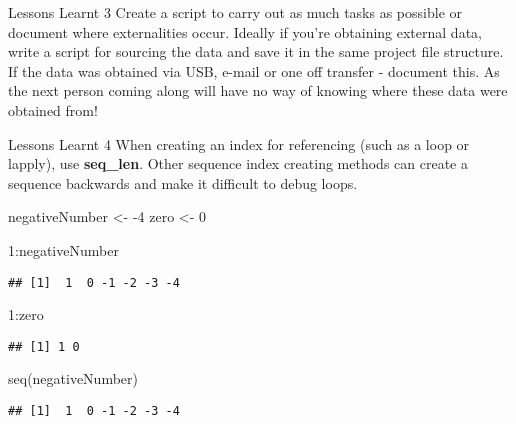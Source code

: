 \documentclass[
  ignorenonframetext,
]{beamer}
\newenvironment{Shaded}{\begin{snugshade}}{\end{snugshade}}
\newcommand{\DecValTok}[1]{\textcolor[rgb]{0.00,0.00,0.81}{#1}}
\newcommand{\FunctionTok}[1]{\textcolor[rgb]{0.00,0.00,0.00}{#1}}
\newcommand{\NormalTok}[1]{#1}
\newcommand{\OtherTok}[1]{\textcolor[rgb]{0.56,0.35,0.01}{#1}}
\newcommand{\SpecialCharTok}[1]{\textcolor[rgb]{0.00,0.00,0.00}{#1}}
\begin{document}
\begin{frame}{Lessons Learnt 3}
\protect\hypertarget{lessons-learnt-3}{}
Create a script to carry out as much tasks as possible or document where
externalities occur. Ideally if you're obtaining external data, write a
script for sourcing the data and save it in the same project file
structure. If the data was obtained via USB, e-mail or one off transfer
- document this. As the next person coming along will have no way of
knowing where these data were obtained from!
\end{frame}

\begin{frame}[fragile]{Lessons Learnt 4}
\protect\hypertarget{lessons-learnt-4}{}
When creating an index for referencing (such as a loop or lapply), use
\textbf{seq\_len}. Other sequence index creating methods can create a
sequence backwards and make it difficult to debug loops.

\begin{Shaded}
\begin{Highlighting}[]
\NormalTok{negativeNumber }\OtherTok{\textless{}{-}} \SpecialCharTok{{-}}\DecValTok{4}
\NormalTok{zero }\OtherTok{\textless{}{-}} \DecValTok{0}

\DecValTok{1}\SpecialCharTok{:}\NormalTok{negativeNumber}
\end{Highlighting}
\end{Shaded}

\begin{verbatim}
## [1]  1  0 -1 -2 -3 -4
\end{verbatim}

\begin{Shaded}
\begin{Highlighting}[]
\DecValTok{1}\SpecialCharTok{:}\NormalTok{zero}
\end{Highlighting}
\end{Shaded}

\begin{verbatim}
## [1] 1 0
\end{verbatim}

\begin{Shaded}
\begin{Highlighting}[]
\FunctionTok{seq}\NormalTok{(negativeNumber)}
\end{Highlighting}
\end{Shaded}

\begin{verbatim}
## [1]  1  0 -1 -2 -3 -4
\end{verbatim}


\end{frame}
\end{document}
